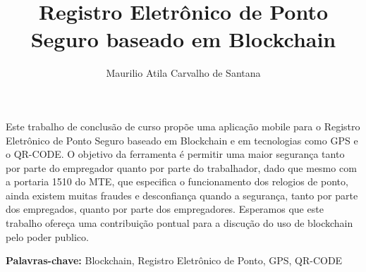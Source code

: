 \documentclass[12pt,openright,twoside,a4paper,english, brazil]{abntex2} %
\title{Registro Eletrônico de Ponto Seguro baseado em Blockchain}
\author{Maurilio Atila Carvalho de Santana}
\begin{document}
\maketitle





\folhaderosto
	

\begin{resumo}

Este trabalho de conclusão de curso propõe uma aplicação mobile para o Registro Eletrônico de Ponto Seguro baseado em Blockchain e em tecnologias como GPS e o QR-CODE. O objetivo da ferramenta é permitir uma maior segurança tanto por parte do empregador quanto por parte do trabalhador, dado que mesmo com a portaria 1510 do MTE, que especifica o funcionamento dos relogios de ponto, ainda existem muitas fraudes e desconfiança quando a segurança, tanto por parte dos empregados, quanto por parte dos empregadores. Esperamos que este trabalho ofereça uma contribuição pontual para a discução do uso de blockchain pelo poder publico.

\textbf{Palavras-chave: } Blockchain, Registro Eletrônico de Ponto, GPS, QR-CODE

\end{resumo}

%
%
%
\end{document}
